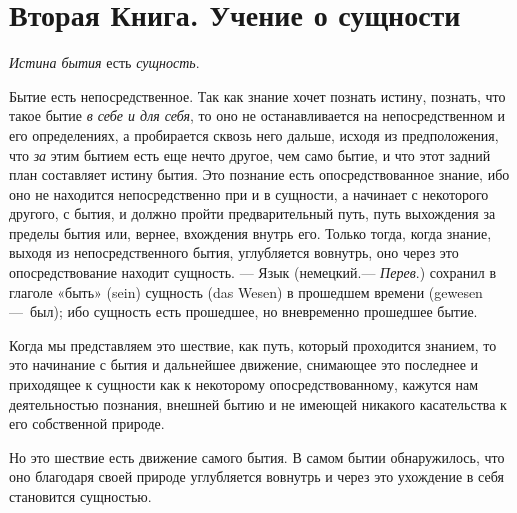 \clearpage\section{Вторая Книга. Учение о сущности}
\clearpage\clearpage
{\em Истина бытия} есть
{\em сущность}.

Бытие есть непосредственное. Так как знание хочет познать истину, познать,
что такое бытие {\em в себе и для себя}, то оно не
останавливается на непосредственном и его определениях, а пробирается
сквозь него дальше, исходя из предположения, что
{\em за} этим бытием есть еще нечто другое, чем само
бытие, и что этот задний план составляет истину бытия. Это познание есть
опосредствованное знание, ибо оно не находится непосредственно при и в
сущности, а начинает с некоторого другого, с бытия, и должно пройти
предварительный путь, путь выхождения за пределы бытия или, вернее,
вхождения внутрь его. Только тогда, когда знание, выходя из
непосредственного бытия, углубляется вовнутрь, оно через это
опосредствование находит сущность. — Язык (немецкий.— {\em Перев}.)
сохранил в глаголе «быть» (sein) сущность (das Wesen) в прошедшем времени
(gewesen —~был); ибо сущность есть прошедшее, но вневременно прошедшее
бытие.

Когда мы представляем это шествие, как путь, который проходится знанием, то
это начинание с бытия и дальнейшее движение, снимающее это последнее и
приходящее к сущности как к некоторому опосредствованному, кажутся нам
деятельностью познания, внешней бытию и не имеющей никакого касательства к
его собственной природе.

Но это шествие есть движение самого бытия. В самом бытии обнаружилось, что
оно благодаря своей природе углубляется вовнутрь и через это ухождение в
себя становится сущностью.

